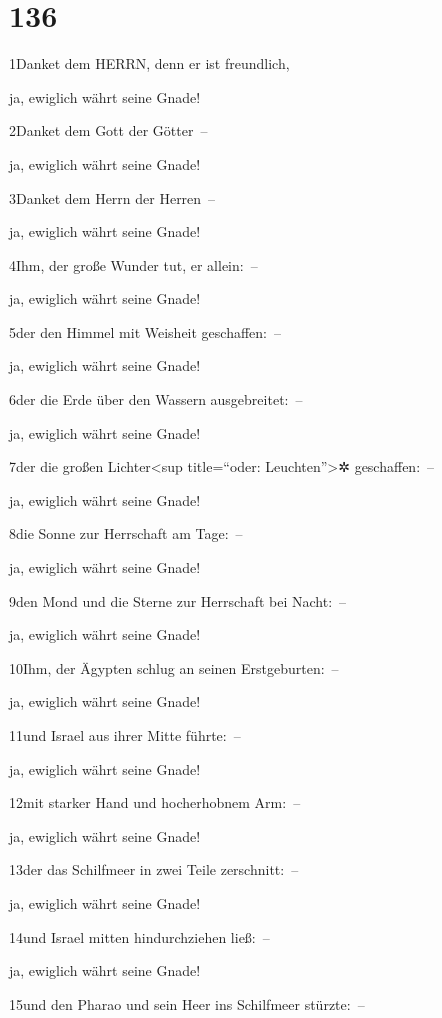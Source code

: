 \hypertarget{section-135}{%
\section{136}\label{section-135}}

1Danket dem HERRN, denn er ist freundlich,

ja, ewiglich währt seine Gnade!

2Danket dem Gott der Götter~--

ja, ewiglich währt seine Gnade!

3Danket dem Herrn der Herren~--

ja, ewiglich währt seine Gnade!

4Ihm, der große Wunder tut, er allein:~--

ja, ewiglich währt seine Gnade!

5der den Himmel mit Weisheit geschaffen:~--

ja, ewiglich währt seine Gnade!

6der die Erde über den Wassern ausgebreitet:~--

ja, ewiglich währt seine Gnade!

7der die großen Lichter\textless sup title=``oder:
Leuchten''\textgreater✲ geschaffen:~--

ja, ewiglich währt seine Gnade!

8die Sonne zur Herrschaft am Tage:~--

ja, ewiglich währt seine Gnade!

9den Mond und die Sterne zur Herrschaft bei Nacht:~--

ja, ewiglich währt seine Gnade!

10Ihm, der Ägypten schlug an seinen Erstgeburten:~--

ja, ewiglich währt seine Gnade!

11und Israel aus ihrer Mitte führte:~--

ja, ewiglich währt seine Gnade!

12mit starker Hand und hocherhobnem Arm:~--

ja, ewiglich währt seine Gnade!

13der das Schilfmeer in zwei Teile zerschnitt:~--

ja, ewiglich währt seine Gnade!

14und Israel mitten hindurchziehen ließ:~--

ja, ewiglich währt seine Gnade!

15und den Pharao und sein Heer ins Schilfmeer stürzte:~--

